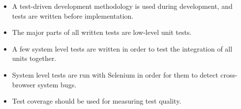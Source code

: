 
\begin{itemize}
    \item A test-driven development methodology is used during
          development, and tests are written before implementation.
    \item The major parts of all written tests are low-level unit tests.
    \item A few system level tests are written in order to test the
          integration of all units together.
    \item System level tests are run with Selenium in order for them
          to detect cross-browser system bugs.
    \item Test coverage should be used for measuring test quality.
\end{itemize}
